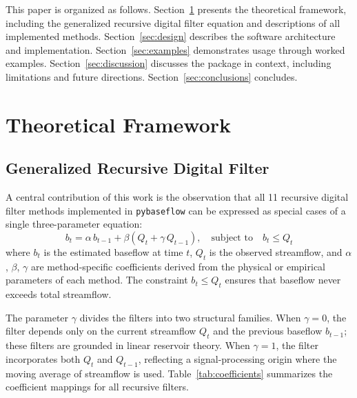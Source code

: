 \documentclass[hydrology,article,submit,pdftex,moreauthors]{Definitions/mdpi}
\begin{document}
This paper is organized as follows. Section~\ref{sec:framework} presents the theoretical framework, including the generalized recursive digital filter equation and descriptions of all implemented methods. Section~\ref{sec:design} describes the software architecture and implementation. Section~\ref{sec:examples} demonstrates usage through worked examples. Section~\ref{sec:discussion} discusses the package in context, including limitations and future directions. Section~\ref{sec:conclusions} concludes.

\section{Theoretical Framework}
\label{sec:framework}

\subsection{Generalized Recursive Digital Filter}
\label{sec:generalized_filter}

A central contribution of this work is the observation that all 11 recursive digital filter methods implemented in \texttt{pybaseflow} can be expressed as special cases of a single three-parameter equation:
\begin{equation}
\label{eq:generalized}
b_t = \alpha \, b_{t-1} + \beta \left( Q_t + \gamma \, Q_{t-1} \right), \quad \text{subject to} \quad b_t \leq Q_t
\end{equation}
where $b_t$ is the estimated baseflow at time $t$, $Q_t$ is the observed streamflow, and $\alpha$, $\beta$, $\gamma$ are method-specific coefficients derived from the physical or empirical parameters of each method. The constraint $b_t \leq Q_t$ ensures that baseflow never exceeds total streamflow.

The parameter $\gamma$ divides the filters into two structural families. When $\gamma = 0$, the filter depends only on the current streamflow $Q_t$ and the previous baseflow $b_{t-1}$; these filters are grounded in linear reservoir theory. When $\gamma = 1$, the filter incorporates both $Q_t$ and $Q_{t-1}$, reflecting a signal-processing origin where the moving average of streamflow is used. Table~\ref{tab:coefficients} summarizes the coefficient mappings for all recursive filters.
\end{document}
